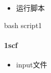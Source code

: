 \documentclass[a4paper,12pt,english]{sphinxmanual}
\begin{document}
\begin{itemize}
\item {} 
\sphinxAtStartPar
运行脚本

\end{itemize}

\begin{sphinxVerbatim}[commandchars=\\\{\}]
bash script\PYGZus{}1
\end{sphinxVerbatim}


\paragraph{1\sphinxhyphen{}scf}
\label{\detokenize{tutorials/berkeleygw/gw:scf}}\begin{itemize}
\item {} 
\sphinxAtStartPar
input文件

\end{itemize}
\end{document}
